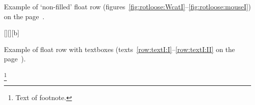 \Text
\Text

\clearpage
Example of `non-filled' float row
(figures~\ref{fig:rotloose:WcatI}--\ref{fig:rotloose:mouseI}) on the page~\pageref{fig:rotloose:WcatI}.

\begin{sidewaysfigure*}
\wideemptyfloatpage\CADJtrue
\begin{floatrow}[3]
{\caption{Beside figure~I in wide rotated float row. Vertically centered}%
\label{fig:rotloose:WcatI}}%

[\FBwidth][][b]
{\caption{Beside figure~II in wide rotated float row. Flushed to bottom of box}%
\label{fig:rotloose:BcatI}%
%
}%
{\unitlength\ifx\pspicture\undefined\else{}\fi
 }%

{\caption{Beside figure~III in wide rotated float row. Flushed to top of object box}%
\label{fig:rotloose:mouseI}}%
\end{floatrow}
\end{sidewaysfigure*}

\Text
\Text

\Text
\Text

\clearpage
Example of float row with textboxes (texts~\ref{row:textI:I}--\ref{row:textI:II} on the page~\pageref{row:textI:II}).

\begin{sidewaystextbox*}
\wideemptyfloatpage
\begin{floatrow}
\ttextbox
{\TEXTBOX\par\TEXTBOX\footnote
{Text of footnote. \text}}
{\caption{Beside text~I. \text}%
\label{row:textI:I}}%

{\caption{Beside text~II}%
\label{row:textI:II}%
%
}%
{\TEXTBOX[ \text.]}%
\end{floatrow}
\end{sidewaystextbox*}

\Text \Text \Text

\Text \Text

